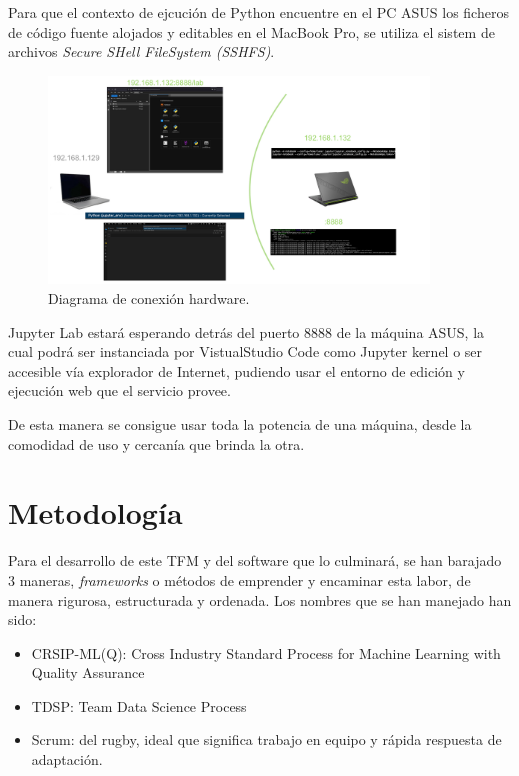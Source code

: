 Para que el contexto de ejcución de Python encuentre en el PC ASUS los ficheros de código fuente alojados y editables en el MacBook Pro, se utiliza el sistem de archivos \emph{Secure SHell FileSystem (SSHFS)}.

\begin{figure}[H]
\centering
\includegraphics[width=0.9\textwidth]{images/jupyter-diagram.png}
\caption{Diagrama de conexión hardware.}
\label{fig:jupyter-diagram}
\end{figure}

Jupyter Lab estará esperando detrás del puerto 8888 de la máquina ASUS, la cual podrá ser instanciada por VistualStudio Code como Jupyter kernel o ser accesible vía explorador de Internet, pudiendo usar el entorno de edición y ejecución web que el servicio provee.

De esta manera se consigue usar toda la potencia de una máquina, desde la comodidad de uso y cercanía que brinda la otra.

\section{Metodología}

Para el desarrollo de este TFM y del software que lo culminará, se han barajado 3 maneras, \emph{frameworks} o métodos de emprender y encaminar esta labor, de manera rigurosa, estructurada y ordenada. Los nombres que se han manejado han sido:
\begin{itemize}
    \item CRSIP-ML(Q): Cross Industry Standard Process for Machine Learning with Quality Assurance
    \item TDSP: Team Data Science Process
    \item Scrum: del rugby, ideal que significa trabajo en equipo y rápida respuesta de adaptación.
\end{itemize}

